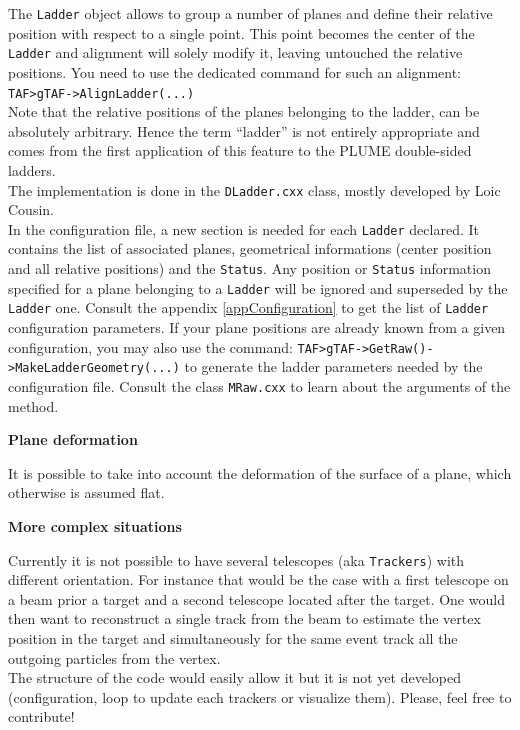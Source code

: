 \documentclass[a4paper, 12pt, twoside]{article}
\newif\ifwithcomment
\newcommand{\comment}[1]{\ifwithcomment {\textcolor{blue}{\it#1}} \fi}
\begin{document}
\noindent
The {\tt Ladder} object allows to group a number of planes and define their relative position with respect to a single point. This point becomes the center of the {\tt Ladder} and alignment will solely modify it, leaving untouched the relative positions. You need to use the dedicated command for such an alignment:\\
{\tt TAF>gTAF->AlignLadder(...)}\\
Note that the relative positions of the planes belonging to the ladder, can be absolutely arbitrary. Hence the term ``ladder'' is not entirely appropriate and comes from the first application of this feature to the PLUME double-sided ladders.\\
The implementation is done in the {\tt DLadder.cxx} class, mostly developed by Loic Cousin.\\

\noindent
In the configuration file, a new section is needed for each {\tt Ladder} declared. It contains the list of associated planes, geometrical informations (center position and all relative positions) and the {\tt Status}. Any position or {\tt Status} information specified for a plane belonging to a {\tt Ladder} will be ignored and superseded by the {\tt Ladder} one. Consult the appendix \ref{appConfiguration} to get the list of {\tt Ladder} configuration parameters. If your plane positions are already known from a given configuration, you may also use the command:
{\tt TAF>gTAF->GetRaw()->MakeLadderGeometry(...)}
to generate the ladder parameters needed by the configuration file. Consult the class {\tt MRaw.cxx} to learn about the arguments of the method.
\\



\vspace{0.8 cm}

\noindent
{\bf Plane deformation}

\noindent
It is possible to take into account the deformation of the surface of a plane, which otherwise is assumed flat.
\comment{Need to describe the procedure.}

\vspace{0.8 cm}

\noindent
{\bf More complex situations}

\noindent
Currently it is not possible to have several telescopes (aka {\tt Trackers}) with different orientation. For instance that would be the case with a first telescope on a beam prior a target and a second telescope located after the target. One would then want to reconstruct a single track from the beam to estimate the vertex position in the target and simultaneously for the same event track all the outgoing particles from the vertex.\\
The structure of the code would easily allow it but it is not yet developed (configuration, loop to update each trackers or visualize them). Please, feel free to contribute! \\
\end{document}
